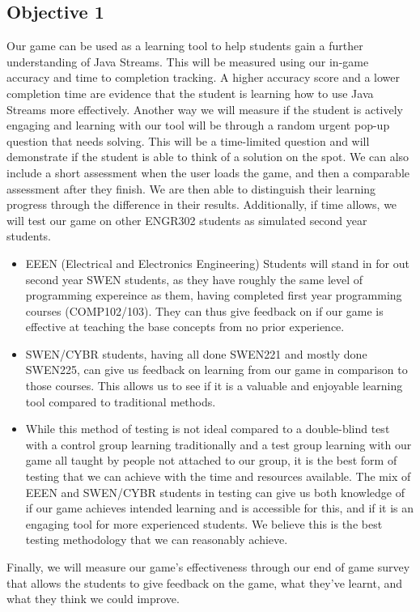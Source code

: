 \documentclass{article}
\begin{document}
\subsection*{Objective 1}
Our game can be used as a learning tool to help students gain a further understanding of Java Streams. This will be measured using our in-game accuracy and time to completion tracking. A higher accuracy score and a lower completion time are evidence that the student is learning how to use Java Streams more effectively.
\newline\newline
Another way we will measure if the student is actively engaging and learning with our tool will be through a random urgent pop-up question that needs solving. This will be a time-limited question and will demonstrate if the student is able to think of a solution on the spot.
\newline\newline
We can also include a short assessment when the user loads the game, and then a comparable assessment after they finish. We are then able to distinguish their learning progress through the difference in their results.
\newline\newline
Additionally, if time allows, we will test our game on other ENGR302 students as simulated second year students.
\begin{itemize}
    \item EEEN (Electrical and Electronics Engineering) Students will stand in for out second year SWEN students, as they have roughly the same level of programming expereince as them, having completed first year programming courses (COMP102/103). They can thus give feedback on if our game is effective at teaching the base concepts from no prior experience.
    \item SWEN/CYBR students, having all done SWEN221 and mostly done SWEN225, can give us feedback on learning from our game in comparison to those courses. This allows us to see if it is a valuable and enjoyable learning tool compared to traditional methods.
    \item While this method of testing is not ideal compared to a double-blind test with a control group learning traditionally and a test group learning with our game all taught by people not attached to our group, it is the best form of testing that we can achieve with the time and resources available. The mix of EEEN and SWEN/CYBR students in testing can give us both knowledge of if our game achieves intended learning and is accessible for this, and if it is an engaging tool for more experienced students. We believe this is the best testing methodology that we can reasonably achieve.
\end{itemize}
Finally, we will measure our game’s effectiveness through our end of game survey that allows the students to give feedback on the game, what they’ve learnt, and what they think we could improve.
\end{document}
